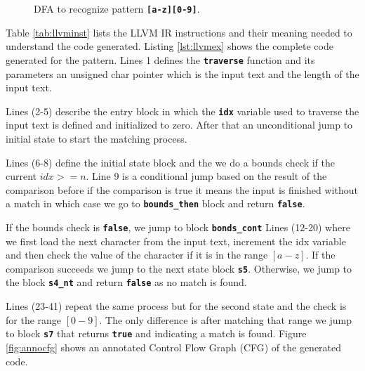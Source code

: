 \begin{figure}[H]
\centering
{}
\caption{DFA to recognize pattern \texttt{\textbf{[a-z][0-9]}}.}
\label{fig:dfacodegenex}
\end{figure}

Table \ref{tab:llvminst} lists the LLVM IR instructions and their meaning needed to understand the code generated. Listing \ref{lst:llvmex} shows the complete code generated for the pattern. Lines 1 defines the \texttt{\textbf{traverse}} function and its parameters an unsigned char pointer which is the input text and the length of the input text.

Lines (2-5) describe the entry block in which the \texttt{\textbf{idx}} variable used to traverse the input text is defined and initialized to zero. After that an unconditional jump to initial state to start the matching process.

Lines (6-8) define the initial state block and the we do a bounds check if the current $idx >= n$. Line 9 is a conditional jump based on the result of the comparison before if the comparison is true it means the input is finished without a match in which case we go to \texttt{\textbf{bounds\_then}} block and return \texttt{\textbf{false}}.

If the bounds check is \texttt{\textbf{false}}, we jump to block \texttt{\textbf{bonds\_cont}} Lines (12-20) where we first load the next character from the input text, increment the idx variable and then check the value of the character if it is in the range $[a - z]$. If the comparison succeeds we jump to the next state block \texttt{\textbf{s5}}. Otherwise, we jump to the block \texttt{\textbf{s4\_nt}} and return \texttt{\textbf{false}} as no match is found.

Lines (23-41) repeat the same process but for the second state and the check is for the range $[0-9]$. The only difference is after matching that range we jump to block \texttt{\textbf{s7}} that returns \texttt{\textbf{true}} and indicating a match is found. Figure \ref{fig:annocfg} shows an annotated Control Flow Graph (CFG) of the generated code.

